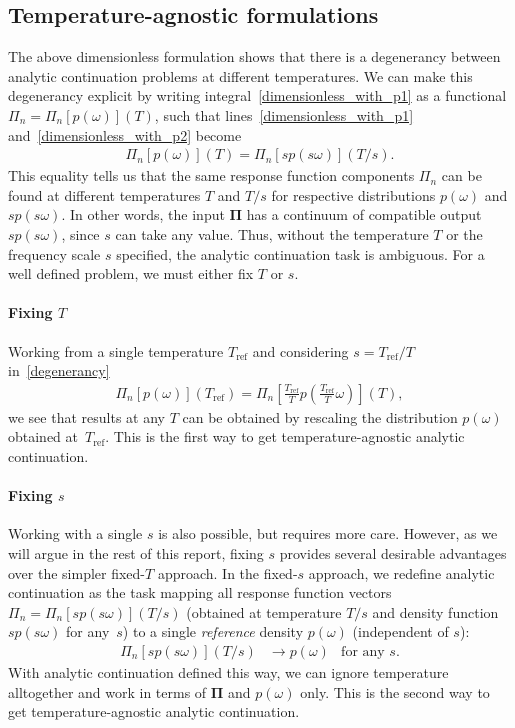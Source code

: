 \documentclass[notitlepage,11pt,nofootinbib]{revtex4-1}
\renewcommand{\vec}[1]{\bm{#1}}
\begin{document}
\subsection{Temperature-agnostic formulations}
\label{section_temperature_agnostic}
The above dimensionless formulation shows that there is a degenerancy between analytic continuation problems at different temperatures. We can make this degenerancy explicit by writing integral~\eqref{dimensionless_with_p1} as a functional $\Pi_n = \Pi_n[p(\omega)](T)$, such that lines~\eqref{dimensionless_with_p1} and~\eqref{dimensionless_with_p2} become 
\begin{align}
\Pi_n[p(\omega)](T) = \Pi_n[sp(s\omega)](T/s).
\label{degenerancy}
\end{align}
This equality tells us that the same response function components $\Pi_n$ can be found at different temperatures $T$ and $T/s$ for respective distributions $p(\omega)$ and $sp(s\omega)$. In other words, the input $\vec \Pi$ has a continuum of compatible output $sp(s\omega)$, since $s$ can take any value. Thus, without the temperature $T$ or the frequency scale $s$ specified, the analytic continuation task is ambiguous. For a well defined problem, we must either fix $T$ or $s$.

\paragraph*{Fixing $T$}
Working from a single temperature $T_\text{{ref}}$ and considering $s=T_\text{{ref}}/T$ in~\eqref{degenerancy}
\begin{align}
    \Pi_n[p(\omega)](T_\text{{ref}}) = \Pi_n[\tfrac{T_{\text{ref}}}{T} p(\tfrac{T_{\text{ref}}}{T}\omega)](T),
    \label{eq_fix_T}
\end{align}
we see that results at any $T$ can be obtained by rescaling the distribution $p(\omega)$ obtained at~$T_\text{{ref}}$. This is the first way to get temperature-agnostic analytic continuation.

\paragraph*{Fixing $s$}
Working with a single $s$ is also possible, but requires more care. However, as we will argue in the rest of this report, fixing $s$ provides several desirable advantages over the simpler fixed-$T$ approach. In the fixed-$s$ approach, we redefine analytic continuation as the task mapping all response function vectors $\Pi_n = \Pi_n[sp(s\omega)](T/s)$ (obtained at temperature $T/s$ and density function $sp(s\omega)$ for any~$s$) to a single \emph{reference} density $p(\omega)$ (independent of $s$):
\begin{align}
    \Pi_n[sp(s\omega)](T/s) &\longrightarrow p(\omega) &\text{for any }s.
    \label{eq_agnostic_ac}
\end{align}
With analytic continuation defined this way, we can ignore temperature alltogether and work in terms of $\vec \Pi$ and $p(\omega)$ only. This is the second way to get temperature-agnostic analytic continuation.
\end{document}
